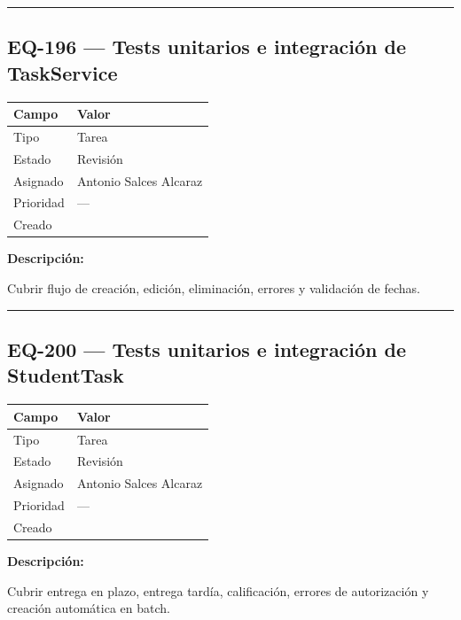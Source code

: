 \documentclass[
  spanish,
  11pt,
]{report}
\newcounter{none} %
\begin{document}
\begin{center}\rule{0.5\linewidth}{0.5pt}\end{center}

\subsection{EQ-196 --- Tests unitarios e integración de
TaskService}\label{eq-196-tests-unitarios-e-integraciuxf3n-de-taskservice}

{\def\LTcaptype{none} %
\begin{longtable}[]{@{}ll@{}}
\toprule\noalign{}
Campo & Valor \\
\midrule\noalign{}
\endhead
\bottomrule\noalign{}
\endlastfoot
Tipo & Tarea \\
Estado & Revisión \\
Asignado & Antonio Salces Alcaraz \\
Prioridad & --- \\
Creado & \\
\end{longtable}
}

\textbf{Descripción:}

Cubrir flujo de creación, edición, eliminación, errores y validación de
fechas.

\begin{center}\rule{0.5\linewidth}{0.5pt}\end{center}

\subsection{EQ-200 --- Tests unitarios e integración de
StudentTask}\label{eq-200-tests-unitarios-e-integraciuxf3n-de-studenttask}

{\def\LTcaptype{none} %
\begin{longtable}[]{@{}ll@{}}
\toprule\noalign{}
Campo & Valor \\
\midrule\noalign{}
\endhead
\bottomrule\noalign{}
\endlastfoot
Tipo & Tarea \\
Estado & Revisión \\
Asignado & Antonio Salces Alcaraz \\
Prioridad & --- \\
Creado & \\
\end{longtable}
}

\textbf{Descripción:}

Cubrir entrega en plazo, entrega tardía, calificación, errores de
autorización y creación automática en batch.
\end{document}

